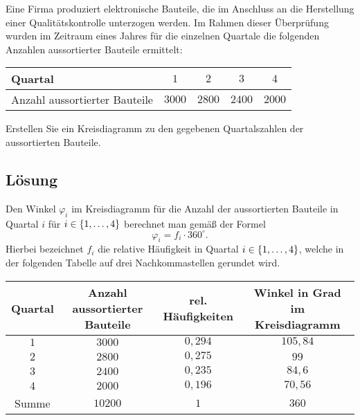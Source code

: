 \documentclass{exercise}
\begin{document}
    \begin{problem}
        Eine Firma produziert elektronische Bauteile, die im Anschluss an die Herstellung einer Qualitätskontrolle unterzogen werden.
        Im Rahmen dieser Überprüfung wurden im Zeitraum eines Jahres für die einzelnen Quartale die folgenden Anzahlen aussortierter Bauteile ermittelt:
        \begin{center}
            \begin{tabular}{lcccc}
                \toprule
                Quartal & \(1\) & \(2\) & \(3\) & \(4\)\\
                \midrule
                Anzahl aussortierter Bauteile & \(3000\) & \(2800\) & \(2400\) & \(2000\)\\
                \bottomrule
            \end{tabular}
        \end{center}
        Erstellen Sie ein Kreisdiagramm zu den gegebenen Quartalszahlen der aussortierten Bauteile.
    \end{problem}

    \subsection*{Lösung}
    Den Winkel \(\varphi_i\) im Kreisdiagramm für die Anzahl der aussortierten Bauteile in Quartal \(i\) für \(i \in \braces*{1, \ldots, 4}\) berechnet man gemäß der Formel
    \[
        \varphi_i = f_i \cdot 360^\circ.
    \]
    Hierbei bezeichnet \(f_i\) die relative Häufigkeit in Quartal \(i \in \braces*{1, \ldots, 4}\), welche in der folgenden Tabelle auf drei Nachkommastellen gerundet wird.
    \begin{center}
        \begin{tabular}{cccc}
            \toprule
            Quartal & Anzahl aussortierter Bauteile & rel. Häufigkeiten & Winkel in Grad im Kreisdiagramm\\
            \midrule
            \(1\) & \(3000\) & \(0,294\) & \(105,84\)\\
            \(2\) & \(2800\) & \(0,275\) & \(99\)\\
            \(3\) & \(2400\) & \(0,235\) & \(84,6\)\\
            \(4\) & \(2000\) & \(0,196\) & \(70,56\)\\
            \midrule
            Summe & \(10200\) & \(1\) & \(360\)\\
            \bottomrule
        \end{tabular}
    \end{center}
    \begin{center}
    \end{center}
\end{document}
